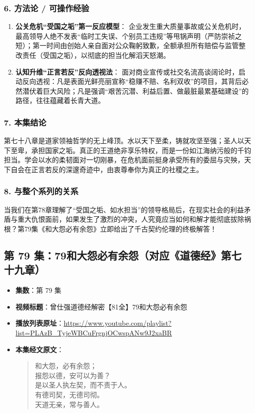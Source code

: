 \subsubsection{6. 方法论 / 可操作经验}
\begin{enumerate}
    \item \textbf{公关危机“受国之垢”第一反应模型}：
    企业发生重大质量事故或公关危机时，最高领导人绝不发表“临时工失误、个别员工违规”等甩锅声明（严防崇祯之短）；第一时间由创始人亲自面对公众鞠躬致歉，全额承担所有赔偿与监管整改责任（受国之垢），以彻底的担当化解滔天怒潮。
    \item \textbf{认知升维“正言若反”反向透视法}：
    面对商业宣传或社交名流高谈阔论时，启动反向透视：凡是表面光鲜亮丽宣称“稳赚不赔、名利双收”的项目，其背后必然潜伏着巨大风险；凡是强调“艰苦沉潜、利益后置、做最脏最累基础建设”的路径，往往蕴藏着长青大道。
\end{enumerate}

\subsubsection{7. 本集结论}
第七十八章是道家领袖哲学的无上峰顶。水以天下至柔，铸就攻坚至强；圣人以天下至卑，承担国家之垢。真正的王道绝非享乐特权，而是一份如江海纳污般的千钧担当。学会以水的柔韧面对一切刚暴，在危机面前挺身承受所有的委屈与灾殃，天下自会在正言若反的深邃奇迹中，由衷尊奉你为真正的社稷之主。

\subsubsection{8. 与整个系列的关系}
当我们在第78章理解了“受国之垢、如水担当”的领导格局后，在现实社会的利益矛盾与重大仇恨面前，如果发生了激烈的冲突，人究竟应当如何和解才能彻底拔除祸根？第79集《和大怨必有余怨》立即给出了千古契约伦理的终极解答！

\clearpage

\subsection{第 79 集：79和大怨必有余怨（对应《道德经》第七十九章）}
\label{sec:ep79}

\begin{itemize}
    \item \textbf{集数}：第 79 集
    \item \textbf{视频标题}：曾仕强道德经解密【81全】79和大怨必有余怨
    \item \textbf{播放列表原址}：\url{https://www.youtube.com/playlist?list=PLAzB_TyjeWBCuFrgnjOCwspANw9J2xaBR}
    \item \textbf{本集经文原文}：
    \begin{quote}\kaishu
    和大怨，必有余怨；\\
    报怨以德，安可以为善？\\
    是以圣人执左契，而不责于人。\\
    有德司契，无德司彻。\\
    天道无亲，常与善人。
    \end{quote}
\end{itemize}

